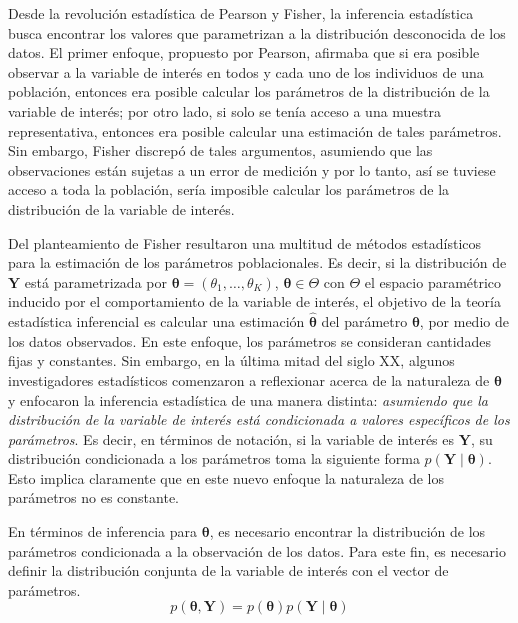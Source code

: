 \documentclass[
  10pt,
  spanish,
]{book}
\theoremstyle{definition}
\theoremstyle{definition}
\theoremstyle{definition}
\theoremstyle{definition}
\theoremstyle{remark}
\begin{document}
Desde la revolución estadística de Pearson y Fisher, la inferencia
estadística busca encontrar los valores que parametrizan a la
distribución desconocida de los datos. El primer enfoque, propuesto por
Pearson, afirmaba que si era posible observar a la variable de interés
en todos y cada uno de los individuos de una población, entonces era
posible calcular los parámetros de la distribución de la variable de
interés; por otro lado, si solo se tenía acceso a una muestra
representativa, entonces era posible calcular una estimación de tales
parámetros. Sin embargo, Fisher discrepó de tales argumentos, asumiendo
que las observaciones están sujetas a un error de medición y por lo
tanto, así se tuviese acceso a toda la población, sería imposible calcular
los parámetros de la distribución de la variable de interés.

Del planteamiento de Fisher resultaron una multitud de métodos
estadísticos para la estimación de los parámetros poblacionales. Es
decir, si la distribución de \(\mathbf{Y}\) está parametrizada por
\(\boldsymbol \theta=(\theta_1,\ldots,\theta_K)\), \(\boldsymbol \theta\in \Theta\) con \(\Theta\)
el espacio paramétrico inducido por el comportamiento de la variable de
interés, el objetivo de la teoría estadística inferencial es calcular
una estimación \(\hat{\boldsymbol \theta}\) del parámetro \(\boldsymbol \theta\), por medio de los
datos observados. En este enfoque, los parámetros se consideran
cantidades fijas y constantes. Sin embargo, en la última mitad del siglo
XX, algunos investigadores estadísticos comenzaron a reflexionar acerca
de la naturaleza de \(\boldsymbol \theta\) y enfocaron la inferencia estadística de
una manera distinta: \emph{asumiendo que la distribución de la variable de
interés está condicionada a valores específicos de los parámetros}. Es
decir, en términos de notación, si la variable de interés es
\(\mathbf{Y}\), su distribución condicionada a los parámetros toma la
siguiente forma \(p(\mathbf{Y} \mid \boldsymbol \theta)\). Esto implica claramente
que en este nuevo enfoque la naturaleza de los parámetros no es
constante.

En términos de inferencia para \(\boldsymbol \theta\), es necesario encontrar la
distribución de los parámetros condicionada a la observación de los
datos. Para este fin, es necesario definir la distribución conjunta de
la variable de interés con el vector de parámetros.
\begin{equation*}
p(\boldsymbol \theta,\mathbf{Y})=p(\boldsymbol \theta)p(\mathbf{Y} \mid \boldsymbol \theta)
\end{equation*}
\end{document}
